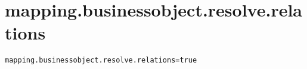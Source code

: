 \section{mapping.businessobject.resolve.relations}
\label{configuration:MappingBusinessobjectResolveRelations}
\ClearAPI
\TODO
{}
\begin{lstlisting}[style=Props,caption={Usage example for \textit{mapping.businessobject.resolve.relations}}]
mapping.businessobject.resolve.relations=true
\end{lstlisting}